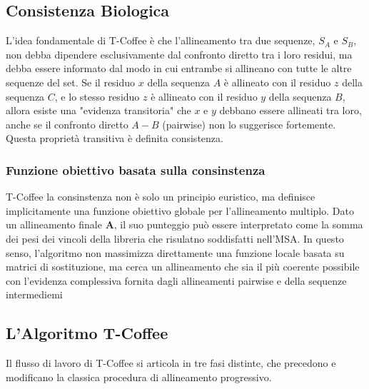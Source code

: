 \subsection{Consistenza Biologica}
L'idea fondamentale di T-Coffee è che l'allineamento tra due sequenze, $S_A$ e $S_B$, non debba dipendere esclusivamente dal confronto diretto tra i loro residui, ma debba essere informato dal modo in cui entrambe si allineano con tutte le altre sequenze del set. Se il residuo $x$ della sequenza $A$ è allineato con il residuo $z$ della sequenza $C$, e lo stesso residuo $z$ è allineato con il residuo $y$ della sequenza $B$, allora esiste una "evidenza transitoria" che $x$ e $y$ debbano essere allineati tra loro, anche se il confronto diretto $A-B$ (pairwise) non lo suggerisce fortemente. Questa proprietà transitiva è definita consistenza.

\subsubsection{Funzione obiettivo basata sulla consinstenza}
T-Coffee la consinstenza non è solo un principio euristico, ma definisce
implicitamente una funzione obiettivo globale per l'allineamento multiplo.
Dato un allineamento finale \textbf{A}, il suo punteggio può essere interpretato
come la somma dei pesi dei vincoli della libreria che risulatno soddisfatti
nell'MSA. In questo senso, l'algoritmo non massimizza direttamente una funzione
locale basata su matrici di sostituzione, ma cerca un allineamento che sia il più coerente possibile con l'evidenza complessiva
fornita dagli allineamenti pairwise e della sequenze intermediemi

\subsection{L'Algoritmo T-Coffee}
Il flusso di lavoro di T-Coffee si articola in tre fasi distinte, che precedono e modificano la classica procedura di allineamento progressivo.

